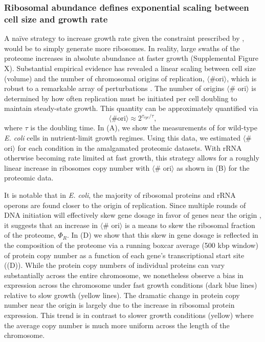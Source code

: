 \subsubsection{Ribosomal abundance defines exponential scaling between cell size
and growth rate}
A na\"ive strategy to increase growth rate given the constraint
prescribed by , would be to simply generate more ribosomes. In
reality, large swaths of the proteome increases in absolute abundance at faster growth
(Supplemental Figure X). Substantial empirical evidence has revealed
a linear scaling between cell size (volume) and the number of chromosomal
origins of replication, $\langle\text{\# ori}\rangle$, which is robust to a
remarkable array of perturbations \citep{si2017}. The number of origins
$\langle$\# ori$\rangle$ is determined by how often replication must be
initiated per cell doubling to maintain steady-state growth. This quantity
can be approximately quantified via
\begin{equation}
    \langle \text{\# ori} \rangle \approx 2^{\tau_{cyc} / \tau},
\end{equation}
where $\tau$ is the doubling time. In (A), we
show the measurements of \cite{si2017} for wild-type \textit{E. coli} cells
in nutrient-limit growth regimes. Using this data, we estimated $\langle$\#
ori$\rangle$ for each condition in the amalgamated proteomic datasets. With
rRNA otherwise becoming rate limited at fast growth, this strategy allows for
a roughly linear increase in ribosomes copy number with $\langle$\#
ori$\rangle$ as shown in (B) for the proteomic
data.

It is notable that in \textit{E. coli}, the majority of ribosomal proteins and rRNA operons are found
closer to the origin of replication. Since multiple rounds of DNA initiation will effectively
skew gene dosage in favor of genes near the origin \citep{scholz2019}, it suggests
that an increase in  $\langle$\# ori$\rangle$ is a means to skew the ribosomal
fraction of the proteome, $\Phi_R$. In (D) we show
that this skew in gene dosage is reflected in the composition of the proteome
via a running boxcar average (500 kbp window) of protein copy number as a function
of each gene's transcriptional start site ((D)).
While the protein copy numbers of individual proteins can vary substantially
across the entire chromosome, we nonetheless observe a bias in expression across
the chromosome under fast growth conditions (dark blue lines) relative to slow
growth (yellow lines). The dramatic
change in protein copy number near the origin is largely due to the increase
in ribosomal protein expression. This trend is in contrast to slower growth
conditions (yellow) where the average copy number is much more uniform across
the length of the chromosome.

